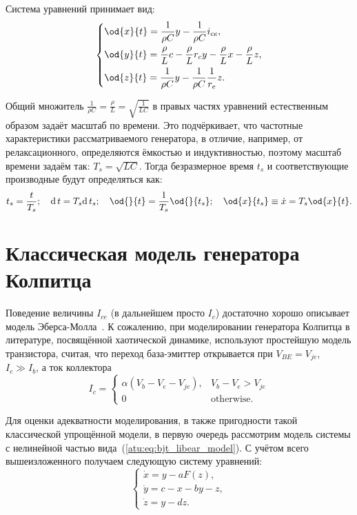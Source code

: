 Система уравнений принимает вид:
%
\begin{equation}
\label{atu:eq:colp_phys2}
\begin{dcases}
  \od{x}{t}  = \dfrac{1}{\rho C}  y - \dfrac{1}{\rho C} i_{ce} , \\
  \od{y}{t}  = \dfrac{\rho}{L} c    - \dfrac{\rho}{L} r_c y - \dfrac{\rho}{L} x- \dfrac{\rho}{L} z, \\
  \od{z}{t}  = \dfrac{1}{\rho C}  y - \dfrac{1}{\rho C} \dfrac{1}{r_e} z.
\end{dcases}
\end{equation}

Общий множитель $ \frac{1}{\rho C} = \frac{\rho}{L} = \sqrt{\frac{1}{LC}} $ в правых частях уравнений
естественным образом задаёт масштаб по времени.
Это подчёркивает, что частотные характеристики рассматриваемого генератора,
в отличие, например, от релаксационного,
определяются ёмкостью и индуктивностью,
поэтому масштаб времени задаём так:
$ T_s = \sqrt{L C} $.
Тогда безразмерное время $t_s$
и соответствующие производные
будут определяться как:
%
\[
  t_s = \frac{t}{T_s}; \quad
  \mathrm{d}\, t = T_s \mathrm{d}\, t_s; \quad
  \od{}{t}  = \frac{1}{T_s} \od{}{t_s}; \quad
  \od{x}{t_s} \equiv \dot{x} = T_s \od{x}{t} .
\]


\section{Классическая модель генератора Колпитца}  %

Поведение величины $I_{ce}$ (в дальнейшем просто $I_c$) достаточно хорошо описывает модель
Эберса-Молла~\cite{horowitz}.
К сожалению, при моделировании генератора Колпитца в литературе,
посвящённой хаотической динамике, используют
простейшую модель транзистора, считая, что переход
база-эмиттер открывается при $V_{BE} = V_{je}$, $ I_c \gg I_b$,
а ток коллектора
%
\begin{equation}
I_c =
  \begin{cases}
    \alpha ( V_b - V_e - V_{je} ), & V_b - V_e > V_{je} \\
    0                              & \text{otherwise}.
  \end{cases}
  \label{atu:eq:bjt_libear_model}
\end{equation}


Для оценки адекватности моделирования, в также пригодности
такой классической упрощённой модели, в первую очередь
рассмотрим модель системы с нелинейной частью вида~(\ref{atu:eq:bjt_libear_model}).
С учётом всего вышеизложенного получаем следующую систему уравнений:
%
\begin{equation}
\label{atu:eq:colp}
\begin{cases}
  \dot{x} = y - a F(z), \\
  \dot{y} = c - x - by - z, \\
  \dot{z} = y - d z.
\end{cases}
\end{equation}

